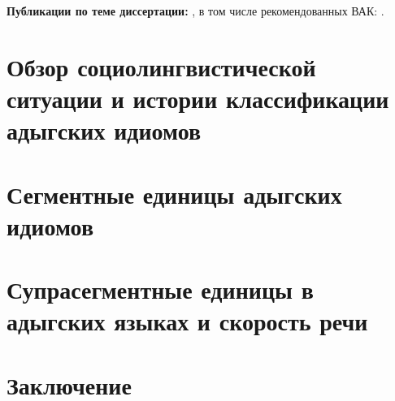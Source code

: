 \documentclass[russian,]{book}
\begin{document}
\textbf{Публикации по теме диссертации:}
\citep{moroz12a, moroz12b, moroz12с, moroz14b, bagirokova15, lander15, moroz17},
в том числе рекомендованных ВАК: \citep{moroz14a, moroz15}.

\chapter{Обзор социолингвистической ситуации и истории классификации
адыгских идиомов}\label{socio}

\chapter{Сегментные единицы адыгских идиомов}\label{segments}

\chapter{Супрасегментные единицы в адыгских языках и скорость
речи}\label{suprasegmentals}

\chapter{Заключение}\label{conclusions}


\end{document}
